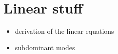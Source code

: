 \chapter{Linear stuff} 
\begin{itemize}
	\item derivation of the linear equations
	\item subdominant modes
\end{itemize} 
